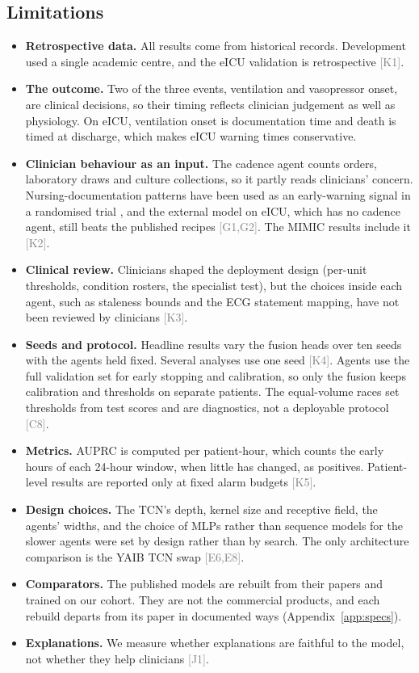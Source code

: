 \documentclass[11pt]{article}
\newcommand{\ev}[1]{\textcolor{gray}{\scriptsize[#1]}}   %
\begin{document}
\subsection{Limitations}
\begin{itemize}
  \item \textbf{Retrospective data.} All results come from historical records.
        Development used a single academic centre, and the eICU validation is
        retrospective \ev{K1}.
  \item \textbf{The outcome.} Two of the three events, ventilation and
        vasopressor onset, are clinical decisions, so their timing reflects
        clinician judgement as well as physiology. On eICU, ventilation onset is
        documentation time and death is timed at discharge, which makes eICU
        warning times conservative.
  \item \textbf{Clinician behaviour as an input.} The cadence agent counts
        orders, laboratory draws and culture collections, so it partly reads
        clinicians' concern. Nursing-documentation patterns have been used as an
        early-warning signal in a randomised trial \cite{rossetti2025concern},
        and the external model on eICU, which has no cadence agent, still beats
        the published recipes \ev{G1,G2}. The MIMIC results include it \ev{K2}.
  \item \textbf{Clinical review.} Clinicians shaped the deployment design (per-unit
        thresholds, condition rosters, the specialist test), but the choices
        inside each agent, such as staleness bounds and the ECG statement
        mapping, have not been reviewed by clinicians \ev{K3}.
  \item \textbf{Seeds and protocol.} Headline results vary the fusion heads over
        ten seeds with the agents held fixed. Several analyses use one seed
        \ev{K4}. Agents use the full validation set for early stopping and
        calibration, so only the fusion keeps calibration and thresholds on
        separate patients. The equal-volume races set thresholds from test
        scores and are diagnostics, not a deployable protocol \ev{C8}.
  \item \textbf{Metrics.} AUPRC is computed per patient-hour, which counts the
        early hours of each 24-hour window, when little has changed, as
        positives. Patient-level results are reported only at fixed alarm
        budgets \ev{K5}.
  \item \textbf{Design choices.} The TCN's depth, kernel size and receptive
        field, the agents' widths, and the choice of MLPs rather than sequence
        models for the slower agents were set by design rather than by search.
        The only architecture comparison is the YAIB TCN swap \ev{E6,E8}.
  \item \textbf{Comparators.} The published models are rebuilt from their papers
        and trained on our cohort. They are not the commercial products, and each
        rebuild departs from its paper in documented ways (Appendix~\ref{app:specs}).
  \item \textbf{Explanations.} We measure whether explanations are faithful to
        the model, not whether they help clinicians \ev{J1}.
\end{itemize}
\end{document}
